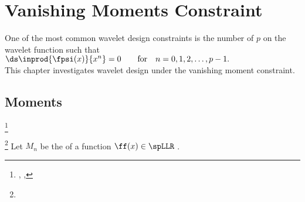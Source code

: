 ﻿%

\chapter{Vanishing Moments Constraint}
\label{chp:vanish}
One of the most common wavelet design constraints is
the number of  $p$ on the wavelet function such that
  \\\indentx$\ds\inprod{\fpsi(x)}{x^n}=0 \qquad\text{for}\quad n=0,1,2,\ldots,p-1.$\\
This chapter investigates wavelet design under the vanishing moment constraint.

\section{Moments}
\label{sec:vanish}
\begin{definition}
\footnote{
  ,
  ,
  }
\label{def:Mn}
\end{definition}

\begin{definition}
\footnote{
  }
\label{def:vanish}
Let $M_n$ be the   of a function $\ff(x)\in\spLLR$ .
\end{definition}

